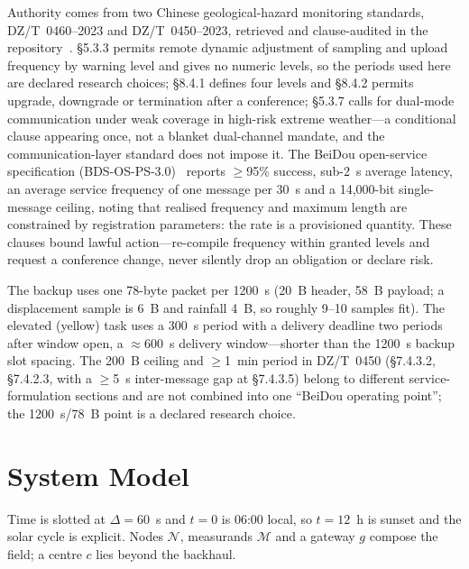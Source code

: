 \documentclass[journal,10pt]{IEEEtran}
\begin{document}
Authority comes from two Chinese geological-hazard monitoring standards, DZ/T~0460--2023 and
DZ/T~0450--2023, retrieved and clause-audited in the repository~\cite{dzt0460,dzt0450}.
\S5.3.3 permits remote dynamic adjustment of sampling and upload frequency by warning level and
gives no numeric levels, so the periods used here are declared research choices; \S8.4.1 defines
four levels and \S8.4.2 permits upgrade, downgrade or termination after a conference; \S5.3.7
calls for dual-mode communication under weak coverage in high-risk extreme weather---a
conditional clause appearing once, not a blanket dual-channel mandate, and the communication-layer
standard does not impose it. The BeiDou open-service specification
(BDS-OS-PS-3.0)~\cite{bdsps3} reports $\geq$95\% success, sub-2~s average latency, an average
service frequency of one message per 30~s and a 14{,}000-bit single-message ceiling, noting that
realised frequency and maximum length are constrained by registration parameters: the rate is a
provisioned quantity. These clauses bound lawful action---re-compile frequency within granted
levels and request a conference change, never silently drop an obligation or declare risk.

The backup uses one 78-byte packet per 1200~s (20~B header, 58~B payload; a displacement sample is
6~B and rainfall 4~B, so roughly 9--10 samples fit). The elevated (yellow) task uses a 300~s
period with a delivery deadline two periods after window open, a $\approx$600~s delivery
window---shorter than the 1200~s backup slot spacing. The 200~B ceiling and $\geq$1~min period in
DZ/T~0450 (\S7.4.3.2, \S7.4.2.3, with a $\geq$5~s inter-message gap at \S7.4.3.5) belong to
different service-formulation sections and are not combined into one ``BeiDou operating point'';
the 1200~s/78~B point is a declared research choice.

\section{System Model}
\label{sec:model}

Time is slotted at $\Delta{=}60$~s and $t{=}0$ is 06:00 local, so $t{=}12$~h is sunset and the
solar cycle is explicit. Nodes $\mathcal N$, measurands $\mathcal M$ and a gateway $g$ compose the
field; a centre $c$ lies beyond the backhaul.
\end{document}

